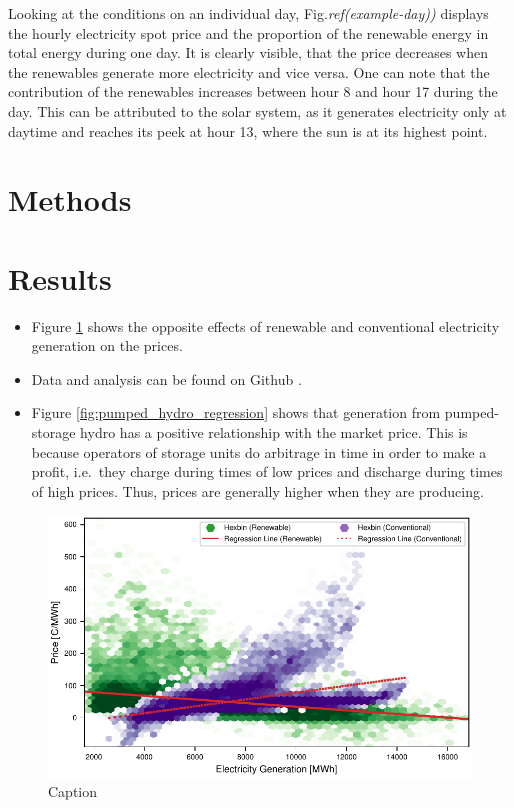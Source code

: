 \documentclass{article}
\begin{document}
Looking at the conditions on an individual day, Fig.\textit{ref(example-day))} displays the hourly electricity spot price and the proportion of the renewable energy in total energy during one day. 
It is clearly visible, that the price decreases when the renewables generate more electricity and vice versa. 
One can note that the contribution of the renewables increases between hour 8 and hour 17 during the day. 
This can be attributed to the solar system, as it generates electricity only at daytime and reaches its peek at hour 13, where the sun is at its highest point. 

\section{Methods}

\section{Results}

\begin{itemize}
    \item Figure \ref{fig:ren_vs_con_regression} shows the opposite effects of renewable and conventional electricity generation on the prices.
    \item Data and analysis can be found on Github \citep{github_repo}.
    \item Figure \ref{fig:pumped_hydro_regression} shows that generation from pumped-storage hydro has a positive relationship with the market price.
    This is because operators of storage units do arbitrage in time in order to make a profit, i.e.\ they charge during times of low prices and discharge during times of high prices.
    Thus, prices are generally higher when they are producing.
\end{itemize}

\begin{figure}
    \centering
    \includegraphics[width=0.7\columnwidth]{doc/fig/ren_vs_con_regression.pdf}
    \caption{Caption}
    \label{fig:ren_vs_con_regression}
\end{figure}
\end{document}
